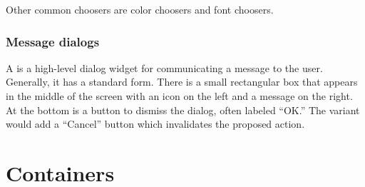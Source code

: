 Other common choosers are color choosers and font choosers.

\subsubsection{Message dialogs}
\label{sec:GUI:message-dialogs}

A  is a high-level dialog widget for
communicating a message to the user. Generally, it has a standard
form. There is a small rectangular box that appears in the middle of
the screen with an icon on the left and a message on the right. At the
bottom is a button to dismiss the dialog, often labeled ``OK.'' The
 variant would add a ``Cancel'' button
which invalidates the proposed action.



\section{Containers}
\label{sec:GUI:basic-components-containers}





